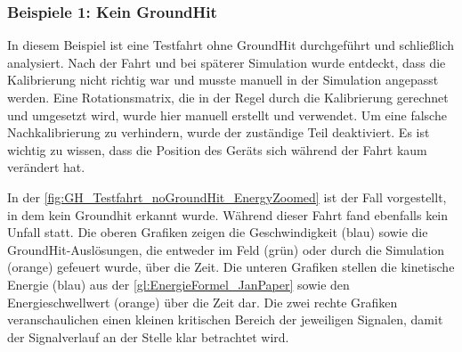 \subsubsection{Beispiele 1: Kein GroundHit}
In diesem Beispiel ist eine Testfahrt ohne GroundHit durchgeführt und schließlich analysiert. Nach der Fahrt und bei späterer Simulation wurde entdeckt, dass die Kalibrierung nicht richtig war und musste manuell in der Simulation angepasst werden. Eine Rotationsmatrix, die in der Regel durch die Kalibrierung gerechnet und umgesetzt wird, wurde hier manuell erstellt und verwendet. Um eine falsche Nachkalibrierung zu verhindern, wurde der zuständige Teil deaktiviert. Es ist wichtig zu wissen, dass die Position des Geräts sich während der Fahrt kaum verändert hat.



In der \autoref{fig:GH_Testfahrt_noGroundHit_EnergyZoomed} ist der Fall vorgestellt, in dem kein Groundhit erkannt wurde. Während dieser Fahrt fand ebenfalls kein Unfall statt. 
Die oberen Grafiken zeigen die Geschwindigkeit (blau) sowie die GroundHit-Auslösungen, die entweder im Feld (grün) oder durch die Simulation (orange) gefeuert wurde, über die Zeit.
Die unteren Grafiken stellen die kinetische Energie (blau) aus der \autoref{gl:EnergieFormel_JanPaper} sowie den Energieschwellwert (orange) über die Zeit dar.
Die zwei rechte Grafiken veranschaulichen einen kleinen kritischen Bereich der jeweiligen Signalen, damit der Signalverlauf an der Stelle klar betrachtet wird.



